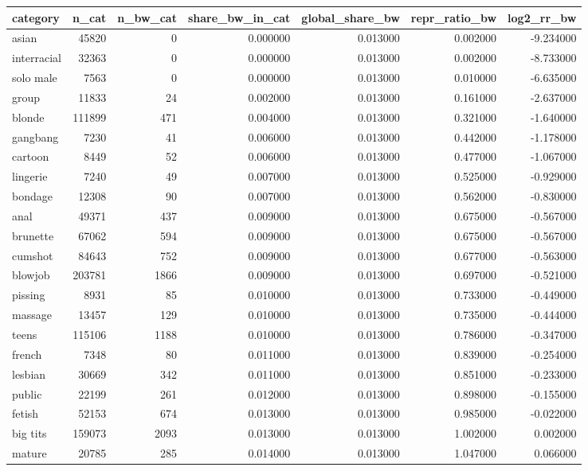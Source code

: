 \begin{tabular}{lrrrrrr}
\toprule
category & n_cat & n_bw_cat & share_bw_in_cat & global_share_bw & repr_ratio_bw & log2_rr_bw \\
\midrule
asian & 45820 & 0 & 0.000000 & 0.013000 & 0.002000 & -9.234000 \\
interracial & 32363 & 0 & 0.000000 & 0.013000 & 0.002000 & -8.733000 \\
solo male & 7563 & 0 & 0.000000 & 0.013000 & 0.010000 & -6.635000 \\
group & 11833 & 24 & 0.002000 & 0.013000 & 0.161000 & -2.637000 \\
blonde & 111899 & 471 & 0.004000 & 0.013000 & 0.321000 & -1.640000 \\
gangbang & 7230 & 41 & 0.006000 & 0.013000 & 0.442000 & -1.178000 \\
cartoon & 8449 & 52 & 0.006000 & 0.013000 & 0.477000 & -1.067000 \\
lingerie & 7240 & 49 & 0.007000 & 0.013000 & 0.525000 & -0.929000 \\
bondage & 12308 & 90 & 0.007000 & 0.013000 & 0.562000 & -0.830000 \\
anal & 49371 & 437 & 0.009000 & 0.013000 & 0.675000 & -0.567000 \\
brunette & 67062 & 594 & 0.009000 & 0.013000 & 0.675000 & -0.567000 \\
cumshot & 84643 & 752 & 0.009000 & 0.013000 & 0.677000 & -0.563000 \\
blowjob & 203781 & 1866 & 0.009000 & 0.013000 & 0.697000 & -0.521000 \\
pissing & 8931 & 85 & 0.010000 & 0.013000 & 0.733000 & -0.449000 \\
massage & 13457 & 129 & 0.010000 & 0.013000 & 0.735000 & -0.444000 \\
teens & 115106 & 1188 & 0.010000 & 0.013000 & 0.786000 & -0.347000 \\
french & 7348 & 80 & 0.011000 & 0.013000 & 0.839000 & -0.254000 \\
lesbian & 30669 & 342 & 0.011000 & 0.013000 & 0.851000 & -0.233000 \\
public & 22199 & 261 & 0.012000 & 0.013000 & 0.898000 & -0.155000 \\
fetish & 52153 & 674 & 0.013000 & 0.013000 & 0.985000 & -0.022000 \\
big tits & 159073 & 2093 & 0.013000 & 0.013000 & 1.002000 & 0.002000 \\
mature & 20785 & 285 & 0.014000 & 0.013000 & 1.047000 & 0.066000 \\

\end{tabular}
